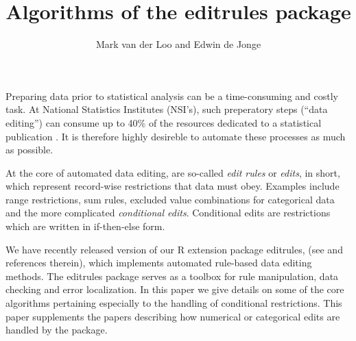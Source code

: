 \documentclass[11pt,fleqn,a4paper]{article}
\title{Algorithms of the editrules package}
\author{Mark van der Loo and Edwin de Jonge}
\begin{document}
\maketitle
Preparing data prior to statistical analysis can be a time-consuming
and costly task. At National Statistics Institutes (NSI's), such
preperatory steps (``data editing'') can consume up to 40\% of the resources
dedicated to a statistical publication \citep{waal:2011}. It is therefore highly desireble to
automate these processes as much as possible.

At the core of automated data editing, are so-called {\em edit rules} or {\em
edits}, in short, which represent record-wise restrictions that data must obey.
Examples include range restrictions, sum rules, excluded value combinations for
categorical data and the more complicated {\em conditional edits}. Conditional
edits are restrictions which are written in {\sf if-then-else} form.

We have recently released version {} of our {\sf R} extension package
{\sf editrules}, (see \cite{loo:2012a} and references therein), which
implements automated rule-based data editing methods. The {\sf editrules}
package serves as a toolbox for rule manipulation, data checking and error
localization. In this paper we give details on some of the core algorithms
pertaining especially to the handling of conditional restrictions. This paper
supplements the papers describing how numerical \citep{jonge:2011}
or categorical \citep{loo:2012} edits are handled  by the package.



\clearpage


\end{document}
